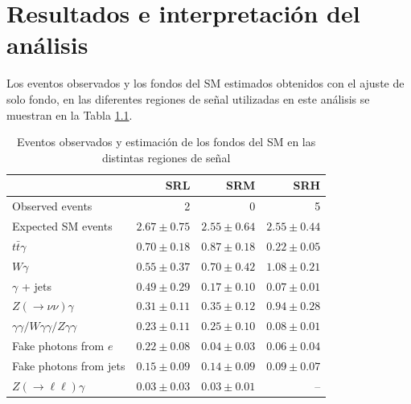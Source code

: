 \chapter{Resultados e interpretación del análisis}




Los eventos observados y los fondos del SM estimados obtenidos con el ajuste de solo fondo, en las diferentes regiones de señal utilizadas en este análisis
se muestran en la Tabla \ref{tab:fit_result_sr}.


\begin{table} 

  \centering
  \begin{tabular}{lrrr}
  \hline
  \hline
                  & SRL & SRM & SRH \\
  \hline
  Observed events & 2 & 0 & 5 \\
  \hline
  Expected SM events & $2.67 \pm 0.75$ & $2.55 \pm 0.64$ & $2.55 \pm 0.44$ \\
  \hline
  $t\bar{t}\gamma$ & $0.70 \pm 0.18$ & $0.87 \pm 0.18$ & $0.22 \pm 0.05$\\
  $W\gamma$ & $0.55 \pm 0.37$ & $0.70 \pm 0.42$ & $1.08 \pm 0.21$\\
  $\gamma$ + jets & $0.49 \pm 0.29$ & $0.17 \pm 0.10$ & $0.07 \pm 0.01$\\
  $Z(\to\nu\nu)\gamma$ & $0.31 \pm 0.11$ & $0.35 \pm 0.12$ & $0.94 \pm 0.28$\\
  $\gamma\gamma / W\gamma\gamma / Z\gamma\gamma$ & $0.23 \pm 0.11$ & $0.25 \pm 0.10$ & $0.08 \pm 0.01$\\
  Fake photons from $e$ & $0.22 \pm 0.08$ & $0.04 \pm 0.03$ & $0.06 \pm 0.04$\\
  Fake photons from jets & $0.15 \pm 0.09$ & $0.14 \pm 0.09$ & $0.09 \pm 0.07$\\
  $Z(\to\ell\ell)\gamma$ & $0.03 \pm 0.03$ & $0.03 \pm 0.01$ & --\\
  \hline
  \hline
  \end{tabular}
  \caption{Eventos observados y estimación de los fondos del SM en las distintas regiones de señal}

  \label{tab:fit_result_sr}


\end{table}




